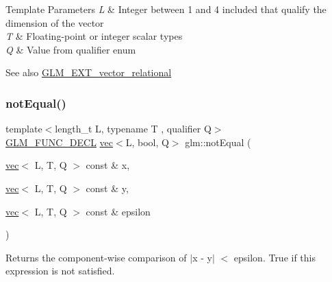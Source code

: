 \begin{DoxyTemplParams}{Template Parameters}
{\em L} & Integer between 1 and 4 included that qualify the dimension of the vector \\
\hline
{\em T} & Floating-\/point or integer scalar types \\
\hline
{\em Q} & Value from qualifier enum\\
\hline
\end{DoxyTemplParams}
\begin{DoxySeeAlso}{See also}
\mbox{\hyperlink{group__ext__vector__relational}{G\+L\+M\+\_\+\+E\+X\+T\+\_\+vector\+\_\+relational}} 
\end{DoxySeeAlso}
\mbox{\label{group__ext__vector__relational_ga0497a636e5e8140bb7ebc021baf86637}} 
\subsubsection{\texorpdfstring{not\+Equal()}{notEqual()}\hspace{0.1cm}{\footnotesize\ttfamily [2/3]}}
{\footnotesize\ttfamily template$<$length\+\_\+t L, typename T , qualifier Q$>$ \\
\mbox{\hyperlink{setup_8hpp_ab2d052de21a70539923e9bcbf6e83a51}{G\+L\+M\+\_\+\+F\+U\+N\+C\+\_\+\+D\+E\+CL}} \mbox{\hyperlink{structglm_1_1vec}{vec}}$<$L, bool, Q$>$ glm\+::not\+Equal (\begin{DoxyParamCaption}\item[{\mbox{\hyperlink{structglm_1_1vec}{vec}}$<$ L, T, Q $>$ const \&}]{x,  }\item[{\mbox{\hyperlink{structglm_1_1vec}{vec}}$<$ L, T, Q $>$ const \&}]{y,  }\item[{\mbox{\hyperlink{structglm_1_1vec}{vec}}$<$ L, T, Q $>$ const \&}]{epsilon }\end{DoxyParamCaption})}

Returns the component-\/wise comparison of $\vert$x -\/ y$\vert$ $<$ epsilon. True if this expression is not satisfied.


